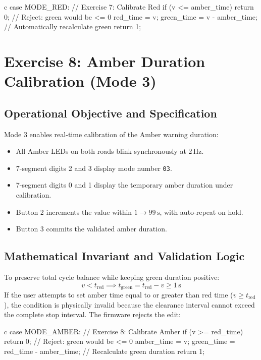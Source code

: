 \documentclass{hcmut-report}
\begin{document}
\begin{code}{c}
case MODE_RED:                                // Exercise 7: Calibrate Red
  if (v <= amber_time) return 0;              // Reject: green would be <= 0
  red_time   = v;
  green_time = v - amber_time;                // Automatically recalculate green
  return 1;
\end{code}


\newpage
\section{Exercise 8: Amber Duration Calibration (Mode 3)}

\subsection{Operational Objective and Specification}
Mode 3 enables real-time calibration of the Amber warning duration:
\begin{itemize}
    \item All Amber LEDs on both roads blink synchronously at $2\,\text{Hz}$.
    \item 7-segment digits 2 and 3 display mode number \texttt{03}.
    \item 7-segment digits 0 and 1 display the temporary amber duration under calibration.
    \item Button 2 increments the value within $1 \to 99\,\text{s}$, with auto-repeat on hold.
    \item Button 3 commits the validated amber duration.
\end{itemize}

\subsection{Mathematical Invariant and Validation Logic}
To preserve total cycle balance while keeping green duration positive:
\begin{equation}
    v < t_{\text{red}} \implies t_{\text{green}} = t_{\text{red}} - v \ge 1\,\text{s}
\end{equation}
If the user attempts to set amber time equal to or greater than red time ($v \ge t_{\text{red}}$), the condition is physically invalid because the clearance interval cannot exceed the complete stop interval. The firmware rejects the edit:

\begin{code}{c}
case MODE_AMBER:                              // Exercise 8: Calibrate Amber
  if (v >= red_time) return 0;                // Reject: green would be <= 0
  amber_time = v;
  green_time = red_time - amber_time;         // Recalculate green duration
  return 1;
\end{code}
\end{document}
